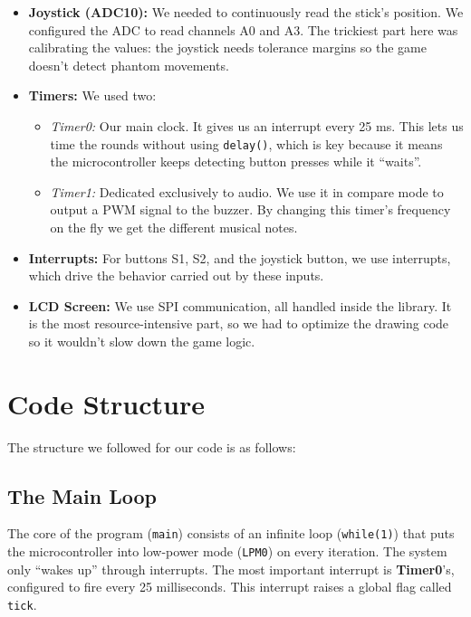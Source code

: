 \documentclass[11pt]{article}
\begin{document}
\begin{itemize}
    \item \textbf{Joystick (ADC10):} We needed to continuously read the stick's position. We configured the ADC to read channels A0 and A3. The trickiest part here was calibrating the values: the joystick needs tolerance margins so the game doesn't detect phantom movements.

    \item \textbf{Timers:} We used two:
    \begin{itemize}
        \item \textit{Timer0:} Our main clock. It gives us an interrupt every 25 ms. This lets us time the rounds without using \texttt{delay()}, which is key because it means the microcontroller keeps detecting button presses while it ``waits''.
        \item \textit{Timer1:} Dedicated exclusively to audio. We use it in compare mode to output a PWM signal to the buzzer. By changing this timer's frequency on the fly we get the different musical notes.
    \end{itemize}

    \item \textbf{Interrupts:} For buttons S1, S2, and the joystick button, we use interrupts, which drive the behavior carried out by these inputs.

    \item \textbf{LCD Screen:} We use SPI communication, all handled inside the library. It is the most resource-intensive part, so we had to optimize the drawing code so it wouldn't slow down the game logic.
\end{itemize}

\section{Code Structure}

The structure we followed for our code is as follows:

\subsection{The Main Loop}

The core of the program (\texttt{main}) consists of an infinite loop (\texttt{while(1)}) that puts the microcontroller into low-power mode (\texttt{LPM0}) on every iteration. The system only ``wakes up'' through interrupts. The most important interrupt is \textbf{Timer0}'s, configured to fire every 25 milliseconds. This interrupt raises a global flag called \texttt{tick}.
\end{document}
